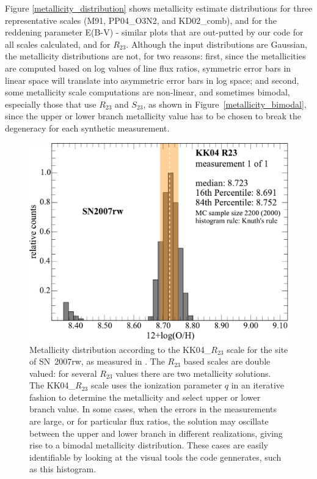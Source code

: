\documentclass{emulateapj}
\begin{document}
Figure \ref{metallicity_distribution} shows metallicity estimate distributions for three representative scales (M91, PP04\_O3N2, and KD02\_comb), and for the reddening parameter E(B-V) - similar plots that are out-putted by our code for all scales calculated, and for $R_{23}$. Although the input distributions are Gaussian, the metallicity distributions are not, for two reasons: first, since the metallicities are computed based on log values of line flux ratios, symmetric error bars in linear space will translate into asymmetric error bars in log space; and second, some metallicity scale computations are non-linear, and sometimes bimodal, especially those that use $R_{23}$ and $S_{23}$, as shown in Figure~\ref{metallicity_bimodal}, since the upper or lower branch metallicity value has to be chosen to break the degeneracy for each synthetic measurement.
\begin{figure}[ht!]
\includegraphics[width=1.0\columnwidth]{SN2007rw_n2000_KK04_R23_1.pdf}
\caption{Metallicity distribution according to the KK04\_$R_{23}$ scale for the site of SN~2007rw, as measured in  \citet{modjaz11}. The $R_{23}$ based scales are double valued: for several $R_{23}$ values there are two metallicity solutions. The KK04\_$R_{23}$ scale uses the ionization parameter $q$ in an iterative fashion to determine the metallicity and select upper or lower branch value. In some cases, when the errors in the measurements are large, or for particular flux ratios, the solution may oscillate between the upper and lower branch in different realizations, giving rise to a bimodal metallicity distribution. These cases are easily identifiable by looking at the visual tools the code gennerates, such as this histogram.}\label{fig:metallicity_bimodal}
\end{figure}
\end{document}
